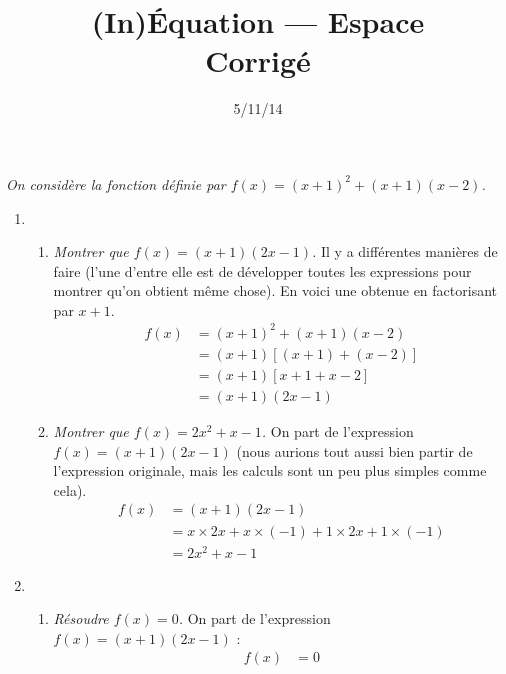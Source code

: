 \documentclass[12pt]{article}
\title{{\small (In)Équation --- Espace}\\ Corrigé}
\date{5/11/14}
\begin{document}
\maketitle

\begin{exercice}
  \emph{On considère la fonction définie par $f(x)=\left( x+1 \right)^2+\left( x+1 \right)\left( x-2 \right)$.}

  \begin{enumerate}[(1)]
    \item \begin{enumerate}

        \item \emph{Montrer que $f(x)=\left( x+1 \right)\left( 2x-1 \right)$.}
          Il y a différentes manières de faire (l'une d'entre elle est de développer toutes les expressions pour montrer qu'on obtient même chose). En voici une obtenue en factorisant par $x+1$.
          \begin{align*}
            f(x)&=\left( x+1 \right)^2+\left( x+1 \right)\left( x-2 \right)\\
            &=\left( x+1 \right)\left[\left( x+1 \right)+\left( x-2 \right)\right]\\
            &=\left( x+1 \right)\left[ x+1+x-2 \right]\\
            &=\left( x+1 \right)\left( 2x-1 \right)
          \end{align*}
        \item \emph{Montrer que $f(x)=2x^2+x-1$.} On part de l'expression $f(x)=\left( x+1 \right)\left( 2x-1 \right)$ (nous aurions tout aussi bien partir de l'expression originale, mais les calculs sont un peu plus simples comme cela).
          \begin{align*}
            f(x) &= \left( x+1 \right)\left( 2x-1 \right)\\
            &= x\times2x+x\times\left( -1 \right)+1\times2x+1\times\left( -1 \right)\\
            &= 2x^2+x-1
          \end{align*}
      \end{enumerate}
    \item \begin{enumerate}
          \pagebreak
        \item \emph{Résoudre $f(x)=0$.} On part de l'expression $f(x)=\left( x+1 \right)\left( 2x-1 \right)$ :
          \begin{align*}
            f(x) &=0\\

\end{align*}
\end{enumerate}
\end{enumerate}
\end{exercice}
\end{document}
